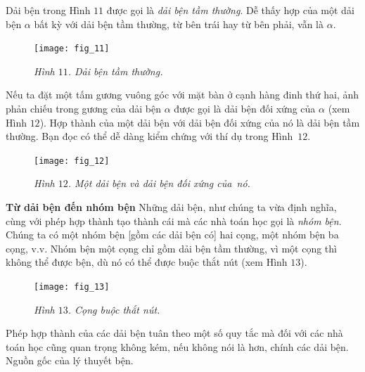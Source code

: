 \begin{multicols}{2}
	Dải bện trong Hình $11$ được gọi là \textit{dải bện tầm thường}. Dễ thấy hợp của một dải bện $\alpha$ bất kỳ với dải bện tầm thường, từ bên trái hay từ bên phải, vẫn là $\alpha$.
	\begin{figure}[H]
		\vspace*{-5pt}
		\centering
		\captionsetup{labelformat= empty, justification=centering}
		\texttt{[image: fig\_11]}
		\caption{\small\textit{\color{duongvaotoanhoc}Hình $11$. Dải bện tầm thường.}}
		\vspace*{-10pt}
	\end{figure}
	Nếu ta đặt một tấm gương vuông góc với mặt bàn ở cạnh hàng đinh thứ hai, ảnh phản chiếu trong gương của dải bện $\alpha$ được gọi là dải bện đối xứng của $\alpha$ (xem Hình $12$). Hợp thành của một dải bện với dải bện đối xứng của nó là dải bện tầm thường. Bạn đọc có thể dễ dàng kiểm chứng với thí dụ trong Hình~$12$.
	\begin{figure}[H]
		\vspace*{-8pt}
		\centering
		\captionsetup{labelformat= empty, justification=centering}
		\texttt{[image: fig\_12]}
		\caption{\small\textit{\color{duongvaotoanhoc}Hình $12$. Một dải bện và dải bện đối xứng của~nó.}}
		\vspace*{-5pt}
	\end{figure}
	\textbf{\color{duongvaotoanhoc}Từ dải bện đến nhóm bện}
	\vskip 0.1cm
	Những dải bện, như chúng ta vừa định nghĩa, cùng với phép hợp thành tạo thành cái mà các nhà toán học gọi là \textit{nhóm bện}. Chúng ta có một nhóm bện [gồm các dải bện có] hai cọng, một nhóm bện ba cọng, v.v. Nhóm bện một cọng chỉ gồm dải bện tầm thường, vì một cọng thì không thể được bện, dù nó có thể được buộc thắt nút (xem Hình $13$).
	\begin{figure}[H]
		\vspace*{-5pt}
		\centering
		\captionsetup{labelformat= empty, justification=centering}
		\texttt{[image: fig\_13]}
		\caption{\small\textit{\color{duongvaotoanhoc}Hình $13$. Cọng buộc thắt nút.}}
		\vspace*{-10pt}
	\end{figure}
	Phép hợp thành của các dải bện tuân theo một số quy tắc mà đối với các nhà toán học cũng quan trọng không kém, nếu không nói là hơn, chính các dải bện.
	Nguồn gốc của lý thuyết bện.
	\begin{tBox}
		\begin{figure}
			\vspace*{-15pt}
			\centering
			\captionsetup{labelformat= empty, justification=centering}

\end{figure}
\end{tBox}
\end{multicols}
